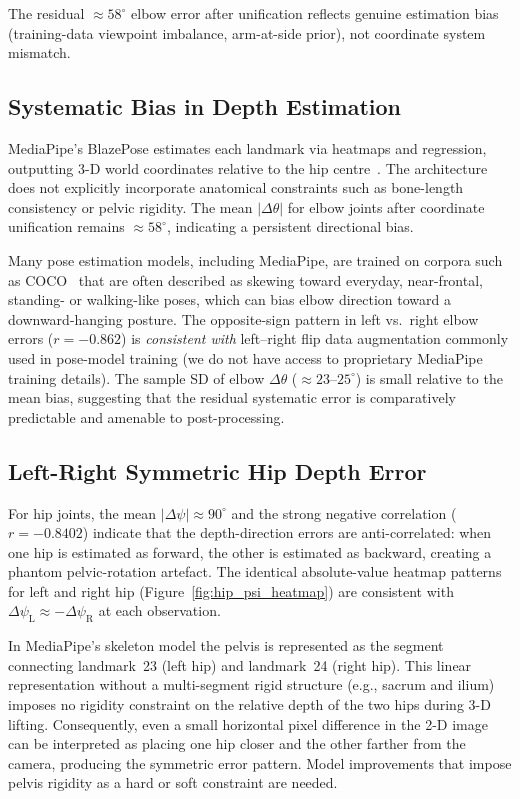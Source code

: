 \documentclass[english,fleqn]{ieej-e}
\begin{document}
The residual $\approx58^{\circ}$ elbow error after unification reflects genuine
estimation bias (training-data viewpoint imbalance, arm-at-side prior),
not coordinate system mismatch.

\subsection{Systematic Bias in Depth Estimation}

MediaPipe's BlazePose estimates each landmark via heatmaps and regression,
outputting 3-D world coordinates relative to the hip
centre~\cite{blazepose}. The architecture does not explicitly incorporate
anatomical constraints such as bone-length consistency or pelvic
rigidity. The mean $|\Delta\theta|$ for elbow joints after coordinate
unification remains $\approx58^{\circ}$, indicating a persistent directional bias.

Many pose estimation models, including MediaPipe, are trained on corpora
such as COCO~\cite{coco} that are often described as skewing toward everyday,
near-frontal, standing- or walking-like poses, which can bias elbow direction
toward a downward-hanging posture. The opposite-sign pattern in left vs.\
right elbow errors ($r=-0.862$) is \emph{consistent with} left--right flip
data augmentation commonly used in pose-model training (we do not have access
to proprietary MediaPipe training details). The sample SD of elbow
$\Delta\theta$ ($\approx23$--$25^{\circ}$) is small relative to the mean
bias, suggesting that the residual systematic error is comparatively
predictable and amenable to post-processing.

\subsection{Left-Right Symmetric Hip Depth Error}

For hip joints, the mean $|\Delta\psi|\approx90^{\circ}$ and the strong negative
correlation ($r=-0.8402$) indicate that the depth-direction errors are
anti-correlated: when one hip is estimated as forward, the other is
estimated as backward, creating a phantom pelvic-rotation artefact. The
identical absolute-value heatmap patterns for left and right hip
(Figure~\ref{fig:hip_psi_heatmap}) are consistent with
$\Delta\psi_{\text{L}} \approx -\Delta\psi_{\text{R}}$ at each observation.

In MediaPipe's skeleton model the pelvis is represented as the segment
connecting landmark~23 (left hip) and landmark~24 (right hip). This linear
representation without a multi-segment rigid structure (e.g., sacrum and
ilium) imposes no rigidity constraint on the relative depth of the two
hips during 3-D lifting. Consequently, even a small horizontal pixel
difference in the 2-D image can be interpreted as placing one hip closer
and the other farther from the camera, producing the symmetric error
pattern. Model improvements that impose pelvis rigidity as a hard or soft
constraint are needed.
\end{document}

